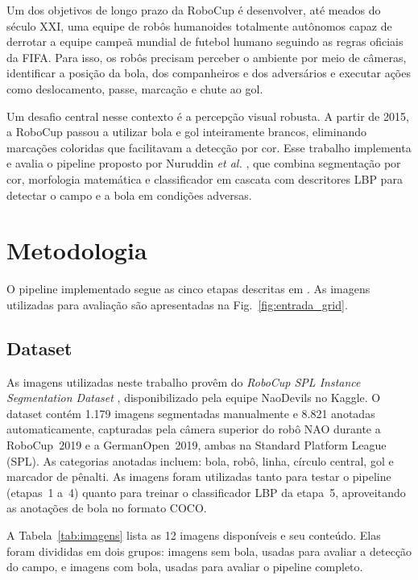 \documentclass[journal]{IEEEtran}
\begin{document}
Um dos objetivos de longo prazo da RoboCup é desenvolver, até meados do século XXI, uma equipe de robôs humanoides totalmente autônomos capaz de derrotar a equipe campeã mundial de futebol humano seguindo as regras oficiais da FIFA. Para isso, os robôs precisam perceber o ambiente por meio de câmeras, identificar a posição da bola, dos companheiros e dos adversários e executar ações como deslocamento, passe, marcação e chute ao gol.

Um desafio central nesse contexto é a percepção visual robusta. A partir de 2015, a RoboCup passou a utilizar bola e gol inteiramente brancos, eliminando marcações coloridas que facilitavam a detecção por cor. Esse trabalho implementa e avalia o pipeline proposto por Nuruddin \textit{et al.} \cite{nuruddin2018}, que combina segmentação por cor, morfologia matemática e classificador em cascata com descritores LBP para detectar o campo e a bola em condições adversas.

\section{Metodologia}

O pipeline implementado segue as cinco etapas descritas em \cite{nuruddin2018}. As imagens utilizadas para avaliação são apresentadas na Fig.~\ref{fig:entrada_grid}.

\subsection{Dataset}

As imagens utilizadas neste trabalho prov\^{e}m do \textit{RoboCup SPL Instance Segmentation Dataset} \cite{naodevils2019}, disponibilizado pela equipe NaoDevils no Kaggle. O dataset cont\'em 1.179 imagens segmentadas manualmente e 8.821 anotadas automaticamente, capturadas pela c\^{a}mera superior do rob\^{o} NAO durante a RoboCup~2019 e a GermanOpen~2019, ambas na Standard Platform League (SPL). As categorias anotadas incluem: bola, rob\^{o}, linha, c\'irculo central, gol e marcador de p\^{e}nalti. As imagens foram utilizadas tanto para testar o pipeline (etapas~1 a~4) quanto para treinar o classificador LBP da etapa~5, aproveitando as anota\c{c}\~{o}es de bola no formato COCO.

A Tabela~\ref{tab:imagens} lista as 12 imagens disponíveis e seu conteúdo. Elas foram divididas em dois grupos: imagens sem bola, usadas para avaliar a detecção do campo, e imagens com bola, usadas para avaliar o pipeline completo.
\end{document}
